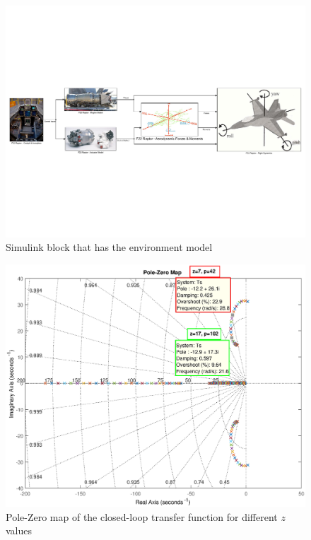 \begin{figure}[H]  %
	\centering
	\includegraphics[trim={0 7.5cm 0 7.5cm},clip,width=\linewidth]{./fig/00_F22_Model_v2}
	\caption{Simulink block that has the environment model}
	\label{00F22Model} 
\end{figure}

\begin{figure}[H]  %
	\centering	
	\includegraphics[width=\linewidth]{./fig/Q01_A_pzmap.eps}
	\caption{Pole-Zero map of the closed-loop transfer function for different $z$ values}
	\label{fig:Q01_A_pzmap} 
\end{figure}

